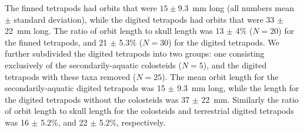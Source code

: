  The finned tetrapods had orbits that were $15 \pm 9.3$~mm long (all numbers mean $\pm$ standard deviation), while the digited tetrapods had orbits that were 33 $\pm$ 22~mm long. The ratio of orbit length to skull length was 13 $\pm$ 4\% ($N=20$) for the finned tetrapods, and 21 $\pm$  5.3\% ($N=30$) for the digited tetrapods. We further subdivided the digited tetrapods into two groups: one consisting exclusively of the secondarily-aquatic colosteids ($N=5$), and the digited tetrapods with these taxa removed ($N=25$). The mean orbit length for the secondarily-aquatic digited tetrapods was 15 $\pm$ 9.3~mm long, while the length for the digited tetrapods without the colosteids was 37 $\pm$ 22~mm. Similarly the ratio of orbit length to skull length for the colosteids and terrestrial digited tetrapods was 16 $\pm$ 5.2\%, and 22 $\pm$ 5.2\%, respectively.